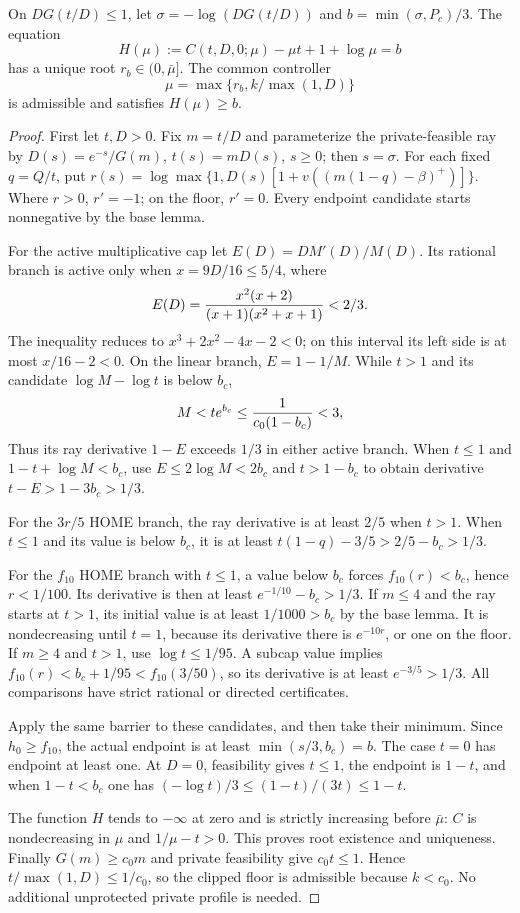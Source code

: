 \begin{theorem}\label{simp:controller}
On $DG(t/D)\le1$, let $\sigma=-\log(DG(t/D))$ and
$b=\min(\sigma,P_c)/3$.
The equation
\[
 H(\mu):=C(t,D,0;\mu)-\mu t+1+\log\mu=b
\]
has a unique root $r_b\in(0,\bar\mu]$.
The common controller
\begin{equation}\label{simp:multiplier}
 \mu=\max\{r_b,k/\max(1,D)\}
\end{equation}
is admissible and satisfies $H(\mu)\ge b$.
\end{theorem}
\begin{proof}
First let $t,D>0$.  Fix $m=t/D$ and parameterize the private-feasible ray
by $D(s)=e^{-s}/G(m)$, $t(s)=mD(s)$, $s\ge0$; then $s=\sigma$.
For each fixed $q=Q/t$, put
$r(s)=\log\max\{1,D(s)[1+v((m(1-q)-\beta)^+)]\}$.
Where $r>0$, $r'=-1$; on the floor, $r'=0$.
Every endpoint candidate starts nonnegative by the base lemma.

For the active multiplicative cap let $E(D)=DM'(D)/M(D)$.
Its rational branch is active only when $x=9D/16\le5/4$, where
\[
 E(D)={x^2(x+2)\over(x+1)(x^2+x+1)}<2/3.
\]
The inequality reduces to $x^3+2x^2-4x-2<0$; on this interval its
left side is at most $x/16-2<0$.
On the linear branch, $E=1-1/M$.
While $t>1$ and its candidate $\log M-\log t$ is below $b_c$,
\[
 M<t e^{b_c}\le{1\over c_0(1-b_c)}<3,
\]
Thus its ray derivative $1-E$ exceeds $1/3$ in either active branch.
When $t\le1$ and $1-t+\log M<b_c$, use
$E\le2\log M<2b_c$ and $t>1-b_c$ to obtain derivative
$t-E>1-3b_c>1/3$.

For the $3r/5$ HOME branch, the ray derivative is at least $2/5$ when
$t>1$.  When $t\le1$ and its value is below $b_c$, it is at least
$t(1-q)-3/5>2/5-b_c>1/3$.

For the $f_{10}$ HOME branch with $t\le1$, a value below $b_c$ forces
$f_{10}(r)<b_c$, hence $r<1/100$.  Its derivative is then at least
$e^{-1/10}-b_c>1/3$.
If $m\le4$ and the ray starts at $t>1$, its initial value is at least
$1/1000>b_c$ by the base lemma.  It is nondecreasing until $t=1$,
because its derivative there is $e^{-10r}$, or one on the floor.
If $m\ge4$ and $t>1$, use $\log t\le1/95$.
A subcap value implies $f_{10}(r)<b_c+1/95<f_{10}(3/50)$, so
its derivative is at least $e^{-3/5}>1/3$.
All comparisons have strict rational or directed certificates.

Apply the same barrier to these candidates, and then take their minimum.
Since $h_0\ge f_{10}$, the actual endpoint is at least
$\min(s/3,b_c)=b$.  The case $t=0$ has endpoint at least one.
At $D=0$, feasibility gives $t\le1$, the endpoint is $1-t$, and
when $1-t<b_c$ one has $(-\log t)/3\le(1-t)/(3t)\le1-t$.

The function $H$ tends to $-\infty$ at zero and is strictly increasing
before $\bar\mu$: $C$ is nondecreasing in $\mu$ and $1/\mu-t>0$.
This proves root existence and uniqueness.
Finally $G(m)\ge c_0m$ and private feasibility give $c_0t\le1$.
Hence $t/\max(1,D)\le1/c_0$, so the clipped floor is admissible
because $k<c_0$.  No additional unprotected private profile is needed.
\end{proof}

